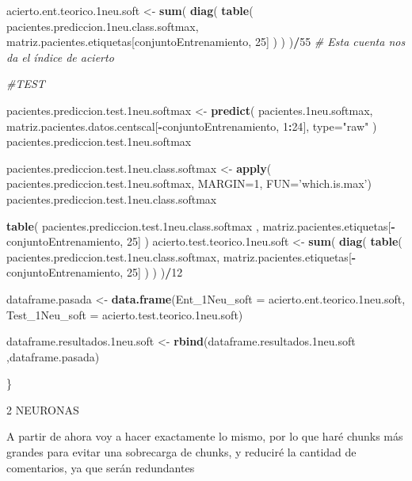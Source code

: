 \documentclass[]{article}
\newenvironment{Shaded}{\begin{snugshade}}{\end{snugshade}}
\newcommand{\KeywordTok}[1]{\textcolor[rgb]{0.13,0.29,0.53}{\textbf{#1}}}
\newcommand{\DataTypeTok}[1]{\textcolor[rgb]{0.13,0.29,0.53}{#1}}
\newcommand{\DecValTok}[1]{\textcolor[rgb]{0.00,0.00,0.81}{#1}}
\newcommand{\StringTok}[1]{\textcolor[rgb]{0.31,0.60,0.02}{#1}}
\newcommand{\CommentTok}[1]{\textcolor[rgb]{0.56,0.35,0.01}{\textit{#1}}}
\newcommand{\OperatorTok}[1]{\textcolor[rgb]{0.81,0.36,0.00}{\textbf{#1}}}
\newcommand{\NormalTok}[1]{#1}
\begin{document}
\begin{Shaded}
\begin{Highlighting}[]
\NormalTok{  acierto.ent.teorico.1neu.soft <-}\StringTok{ }\KeywordTok{sum}\NormalTok{( }\KeywordTok{diag}\NormalTok{( }\KeywordTok{table}\NormalTok{( pacientes.prediccion.1neu.class.softmax, matriz.pacientes.etiquetas[conjuntoEntrenamiento, }\DecValTok{25}\NormalTok{] ) ) )}\OperatorTok{/}\DecValTok{55} \CommentTok{# Esta cuenta nos da el índice de acierto}
  
  \CommentTok{#TEST}
  
\NormalTok{  pacientes.prediccion.test.1neu.softmax <-}\StringTok{ }\KeywordTok{predict}\NormalTok{( pacientes.1neu.softmax, matriz.pacientes.datos.centscal[}\OperatorTok{-}\NormalTok{conjuntoEntrenamiento, }\DecValTok{1}\OperatorTok{:}\DecValTok{24}\NormalTok{], }\DataTypeTok{type=}\StringTok{"raw"}\NormalTok{ )}
\NormalTok{  pacientes.prediccion.test.1neu.softmax}
  
\NormalTok{  pacientes.prediccion.test.1neu.class.softmax <-}\StringTok{ }\KeywordTok{apply}\NormalTok{( pacientes.prediccion.test.1neu.softmax, }\DataTypeTok{MARGIN=}\DecValTok{1}\NormalTok{, }\DataTypeTok{FUN=}\StringTok{'which.is.max'}\NormalTok{)}
\NormalTok{  pacientes.prediccion.test.1neu.class.softmax}
  
  \KeywordTok{table}\NormalTok{( pacientes.prediccion.test.1neu.class.softmax , matriz.pacientes.etiquetas[}\OperatorTok{-}\NormalTok{conjuntoEntrenamiento, }\DecValTok{25}\NormalTok{] )}
\NormalTok{  acierto.test.teorico.1neu.soft <-}\StringTok{ }\KeywordTok{sum}\NormalTok{( }\KeywordTok{diag}\NormalTok{( }\KeywordTok{table}\NormalTok{( pacientes.prediccion.test.1neu.class.softmax, matriz.pacientes.etiquetas[}\OperatorTok{-}\NormalTok{conjuntoEntrenamiento, }\DecValTok{25}\NormalTok{] ) ) )}\OperatorTok{/}\DecValTok{12}
  
\NormalTok{  dataframe.pasada <-}\StringTok{ }\KeywordTok{data.frame}\NormalTok{(}\DataTypeTok{Ent_1Neu_soft =}\NormalTok{ acierto.ent.teorico.1neu.soft,}
                                 \DataTypeTok{Test_1Neu_soft =}\NormalTok{ acierto.test.teorico.1neu.soft)}
  
\NormalTok{  dataframe.resultados.1neu.soft <-}\StringTok{ }\KeywordTok{rbind}\NormalTok{(dataframe.resultados.1neu.soft ,dataframe.pasada)}
  
\NormalTok{\}}
\end{Highlighting}
\end{Shaded}

2 NEURONAS

A partir de ahora voy a hacer exactamente lo mismo, por lo que haré
chunks más grandes para evitar una sobrecarga de chunks, y reduciré la
cantidad de comentarios, ya que serán redundantes
\end{document}
